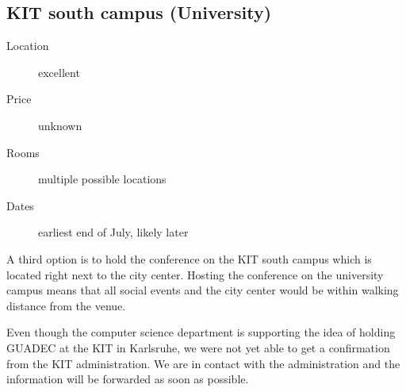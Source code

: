 \newpage

\subsection{KIT south campus (University)}

\begin{description}
\item[Location] excellent
\item[Price] unknown
\item[Rooms] multiple possible locations
\item[Dates] earliest end of July, likely later
\end{description}

A third option is to hold the conference on the KIT south campus which is
located right next to the city center. Hosting the conference on the university
campus means that all social events and the city center would be within walking
distance from the venue.

Even though the computer science department is supporting the idea of holding
GUADEC at the KIT in Karlsruhe, we were not yet able to get a confirmation from
the KIT administration. We are in contact with the administration and the
information will be forwarded as soon as possible.

